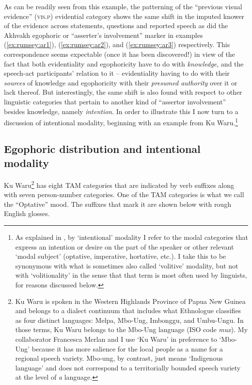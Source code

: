 \documentclass[output=paper]{langsci/langscibook}
\begin{document}
As can be readily seen from this example, the patterning of the “previous visual evidence” (\textsc{vis}.\textsc{p}) evidential category shows the same shift in the imputed knower of the evidence across statements, questions and reported speech as did the Akhvakh egophoric or “asserter’s involvement” marker in examples (\ref{ex:rumsey:ar1}), (\ref{ex:rumsey:ar2}), and (\ref{ex:rumsey:ar3}) respectively. This correspondence seems expectable (once it has been discovered!) in view of the fact that both evidentiality and egophoricity have to do with \textit{knowledge}, and the speech-act participants’ relation to it – evidentiality having to do with their \textit{sources} of knowledge and egophoricity with their \textit{presumed authority} over it or lack thereof. But interestingly, the same shift is also found with respect to other linguistic categories that pertain to another kind of “assertor involvement” besides knowledge, namely \textit{intention}. In order to illustrate this I now turn to a discussion of intentional modality, beginning with an example from Ku Waru.\footnote{As explained in , by ‘intentional’ modality I refer to the modal categories that express an intention or desire on the part of the speaker or other relevant ‘modal subject’ (optative, imperative, hortative, etc.). I take this to be synonymous with what is sometimes also called ‘volitive’ modality, but not with ‘volitionality’ in the sense that that term is most often used by linguists, for reasons discussed below.}


\subsection{Egophoric distribution and intentional modality}\label{s:ar2-2}

Ku Waru\footnote{Ku Waru is spoken in the Western Highlands Province of Papua New Guinea and belongs to a dialect continuum that includes what Ethnologue classifies as four distinct languages: Melpa, Mbo-Ung, Imbonggu, and Umbu-Ungu. In those terms, Ku Waru belongs to the Mbo-Ung language (ISO code \textit{mux}). My collaborator Francesca Merlan and I use ‘Ku Waru’ in preference to ‘Mbo-Ung’ because it has more salience for the local people as a name for a regional speech variety. Mbo-ung, by contrast, just means ‘Indigenous language’ and does not correspond to a territorially bounded speech variety at the level of \textit{a} language.} has eight TAM categories that are indicated by verb suffixes along with seven person-number categories. One of the TAM categories is what we call the “Optative” mood. The suffixes that mark it are shown below with rough English glosses.
\end{document}
